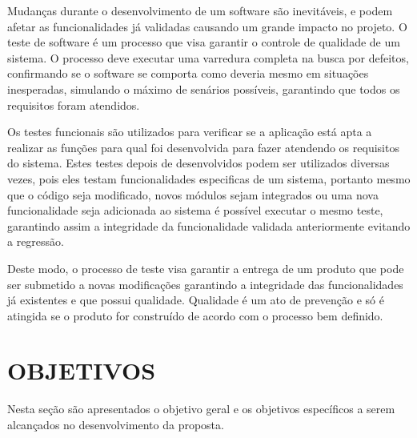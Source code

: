 Mudanças durante o desenvolvimento de um software são inevitáveis, e podem afetar as funcionalidades já validadas causando um grande impacto no projeto. O teste de software é um processo que visa garantir o controle de qualidade de um sistema. O processo deve executar uma varredura completa na busca por defeitos, confirmando se o software se comporta como deveria mesmo em situações inesperadas, simulando o máximo de senários possíveis, garantindo que todos os requisitos foram atendidos. 


Os testes funcionais são utilizados para verificar se a aplicação está apta a realizar as funções para qual foi desenvolvida para fazer atendendo os requisitos do sistema. Estes testes depois de desenvolvidos podem ser utilizados diversas vezes, pois eles testam funcionalidades especificas de um sistema, portanto mesmo que o código seja modificado, novos módulos sejam integrados ou uma nova funcionalidade seja adicionada ao sistema é possível executar o mesmo teste, garantindo assim a integridade da funcionalidade validada anteriormente evitando a regressão.


Deste modo, o processo de teste visa garantir a entrega de um produto que pode ser submetido a novas modificações garantindo a integridade das funcionalidades já existentes e que possui qualidade. Qualidade é um ato de prevenção e só é atingida se o produto for construído de acordo com o processo bem definido. 






\section{OBJETIVOS}

Nesta seção são apresentados o objetivo geral e os objetivos específicos a
serem alcançados no desenvolvimento da proposta.

